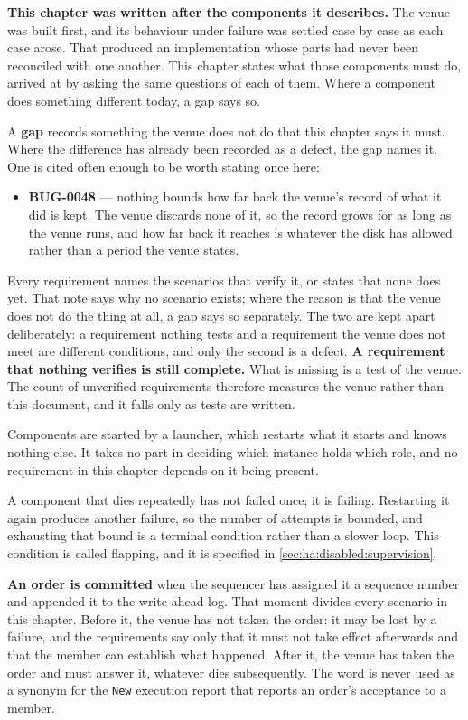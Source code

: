 \textbf{This chapter was written after the components it describes.} The venue
was built first, and its behaviour under failure was settled case by case as
each case arose. That produced an implementation whose parts had never been
reconciled with one another. This chapter states what those components must do,
arrived at by asking the same questions of each of them. Where a component does
something different today, a gap says so.

A \textbf{gap} records something the venue does not do that this chapter says it
must. Where the difference has already been recorded as a defect, the gap names
it. One is cited often enough to be worth stating once here:

\begin{itemize}[nosep]
  \item \textbf{BUG-0048} --- nothing bounds how far back the venue's record of
        what it did is kept. The venue discards none of it, so the record grows
        for as long as the venue runs, and how far back it reaches is whatever
        the disk has allowed rather than a period the venue states.
\end{itemize}

Every requirement names the scenarios that verify it, or states that none does
yet. That note says why no scenario exists; where the reason is that the venue
does not do the thing at all, a gap says so separately. The two are kept apart
deliberately: a requirement nothing tests and a requirement the venue does not
meet are different conditions, and only the second is a defect. \textbf{A
requirement that nothing verifies is still complete.} What is missing is a test
of the venue. The count of unverified requirements therefore measures the venue
rather than this document, and it falls only as tests are written.

\bigskip

Components are started by a launcher, which restarts what it starts and knows
nothing else. It takes no part in deciding which instance holds which role, and
no requirement in this chapter depends on it being present.

A component that dies repeatedly has not failed once; it is failing. Restarting
it again produces another failure, so the number of attempts is bounded, and
exhausting that bound is a terminal condition rather than a slower loop. This
condition is called flapping, and it is specified in
\cref{sec:ha:disabled:supervision}.

\textbf{An order is committed} when the sequencer has assigned it a sequence
number and appended it to the write-ahead log. That moment divides every
scenario in this chapter. Before it, the venue has not taken the order: it may
be lost by a failure, and the requirements say only that it must not take effect
afterwards and that the member can establish what happened. After it, the venue
has taken the order and must answer it, whatever dies subsequently. The
word is never used as a synonym for the \texttt{New} execution report that
reports an order's acceptance to a member.


